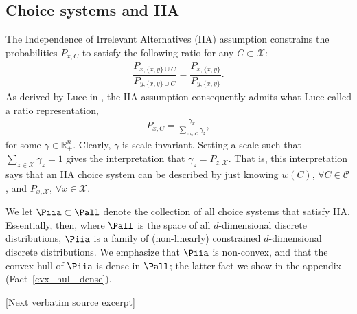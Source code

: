 \documentclass[10pt]{article}
\begin{document}
\begin{ReviewVerbatim}
	\subsection{Choice systems and IIA}
	The Independence of Irrelevant Alternatives (IIA) assumption constrains the probabilities $P_{x,C}$ to satisfy the following ratio for any $C \subset \mathcal{X}$:
	\begin{align*}
	\dfrac{P_{x,\lbrace x, y \rbrace \cup C}}{P_{y,\lbrace x, y \rbrace \cup C}} = \dfrac{P_{x,\lbrace x, y \rbrace}}{P_{y,\lbrace x, y \rbrace}}.
	\end{align*}
	As derived by Luce in \cite{luce1959individual}, the IIA assumption consequently admits what Luce called a ratio representation,
	\begin{align*}
	P_{x,C} = \frac{\gamma_x}{\sum_{z \in C} \gamma_z},
	\end{align*}
	for some $\gamma \in \mathbb{R}_+^n$. Clearly, $\gamma$ is scale invariant. Setting a scale such that $\sum_{z \in \mathcal{X}} \gamma_z = 1$ gives the interpretation that $\gamma_z = P_{z, \mathcal{X}}$.
	That is, this interpretation says that an IIA choice system can be described by just knowing $w(C)$, $\forall  C \in \mathcal{C}$, and $P_{x,\mathcal{X}}$, $\forall x \in \mathcal X$.

	We let $\Piia \subset \Pall$ denote the collection of all choice systems that satisfy IIA. Essentially, then, where $\Pall$ is the space of all $d$-dimensional discrete distributions, $\Piia$ is a family of (non-linearly) constrained $d$-dimensional discrete distributions. We emphasize that $\Piia$ is non-convex, and that the convex hull of $\Piia$ is dense in $\Pall$; the latter fact we show in the appendix (Fact~\ref{cvx_hull_dense}).

[Next verbatim source excerpt]


\end{ReviewVerbatim}
\end{document}
